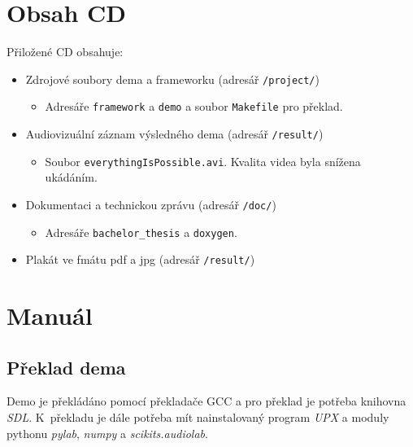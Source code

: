 \chapter{Obsah CD} 
Přiložené CD obsahuje:
\begin{itemize}
  \item Zdrojové soubory dema a frameworku (adresář \texttt{/project/})
    \begin{itemize}
      \item Adresáře \texttt{framework} a \texttt{demo} a soubor \texttt{Makefile} pro překlad.
    \end{itemize}
  \item Audiovizuální záznam výsledného dema (adresář \texttt{/result/})
    \begin{itemize}
      \item Soubor \texttt{everythingIsPossible.avi}. Kvalita videa byla snížena ukádáním.
    \end{itemize}
  \item Dokumentaci a technickou zprávu (adresář \texttt{/doc/})
    \begin{itemize}
      \item Adresáře \texttt{bachelor\_thesis} a \texttt{doxygen}.
    \end{itemize}
  \item Plakát ve fmátu pdf a jpg (adresář \texttt{/result/})

\end{itemize}

\chapter{Manuál}
\section{Překlad dema}
Demo je překládáno pomocí překladače GCC a pro překlad je potřeba knihovna \emph{SDL}.
K~překladu je dále potřeba mít nainstalovaný program \emph{UPX} a moduly pythonu \emph{pylab}, \emph{numpy} a \emph{scikits.audiolab}.

